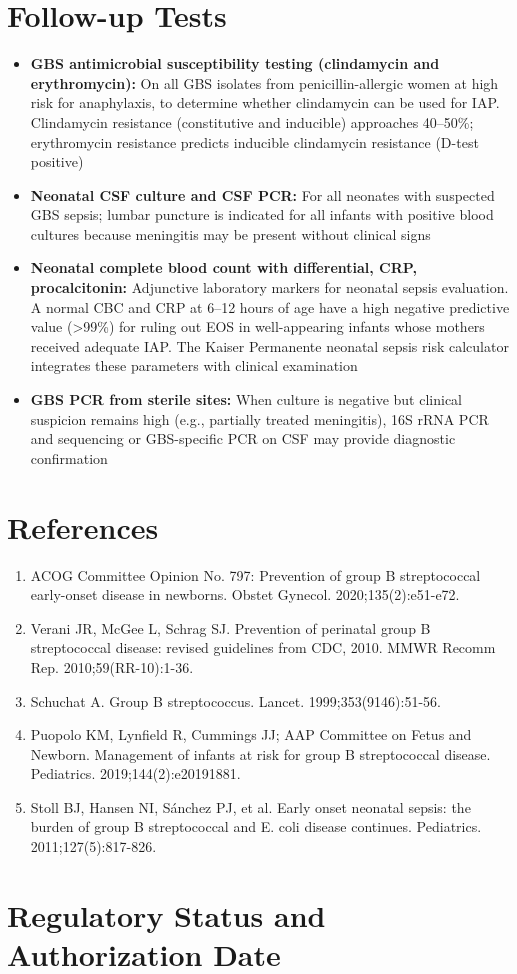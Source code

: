 \section*{Follow-up Tests}
\begin{itemize}
  \item \textbf{GBS antimicrobial susceptibility testing (clindamycin and erythromycin):} On all GBS isolates from penicillin-allergic women at high risk for anaphylaxis, to determine whether clindamycin can be used for IAP. Clindamycin resistance (constitutive and inducible) approaches 40--50\%; erythromycin resistance predicts inducible clindamycin resistance (D-test positive)
  \item \textbf{Neonatal CSF culture and CSF PCR:} For all neonates with suspected GBS sepsis; lumbar puncture is indicated for all infants with positive blood cultures because meningitis may be present without clinical signs
  \item \textbf{Neonatal complete blood count with differential, CRP, procalcitonin:} Adjunctive laboratory markers for neonatal sepsis evaluation. A normal CBC and CRP at 6--12 hours of age have a high negative predictive value (>99\%) for ruling out EOS in well-appearing infants whose mothers received adequate IAP. The Kaiser Permanente neonatal sepsis risk calculator integrates these parameters with clinical examination
  \item \textbf{GBS PCR from sterile sites:} When culture is negative but clinical suspicion remains high (e.g., partially treated meningitis), 16S rRNA PCR and sequencing or GBS-specific PCR on CSF may provide diagnostic confirmation
\end{itemize}

\section*{References}
\begin{enumerate}
  \item ACOG Committee Opinion No. 797: Prevention of group B streptococcal early-onset disease in newborns. Obstet Gynecol. 2020;135(2):e51-e72.
  \item Verani JR, McGee L, Schrag SJ. Prevention of perinatal group B streptococcal disease: revised guidelines from CDC, 2010. MMWR Recomm Rep. 2010;59(RR-10):1-36.
  \item Schuchat A. Group B streptococcus. Lancet. 1999;353(9146):51-56.
  \item Puopolo KM, Lynfield R, Cummings JJ; AAP Committee on Fetus and Newborn. Management of infants at risk for group B streptococcal disease. Pediatrics. 2019;144(2):e20191881.
  \item Stoll BJ, Hansen NI, Sánchez PJ, et al. Early onset neonatal sepsis: the burden of group B streptococcal and E. coli disease continues. Pediatrics. 2011;127(5):817-826.
\end{enumerate}

\clearpage
\section*{Regulatory Status and Authorization Date}

\clearpage
